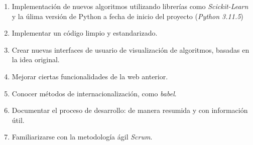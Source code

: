 \begin{enumerate}
	\item Implementación de nuevos algoritmos utilizando librerías como \textit{Scickit-Learn} y la úlima versión de Python a fecha de inicio del proyecto (\textit{Python 3.11.5})
	\item Implementar un código limpio y estandarizado.
	\item Crear nuevas interfaces de usuario de visualización de algoritmos, basadas en la idea original.
	\item Mejorar ciertas funcionalidades de la web anterior.
	\item Conocer métodos de internacionalización, como \textit{babel}.
	\item Documentar el proceso de desarrollo: de manera resumida y con información útil.
	\item Familiarizarse con la metodología ágil \textit{Scrum}.
\end{enumerate}
